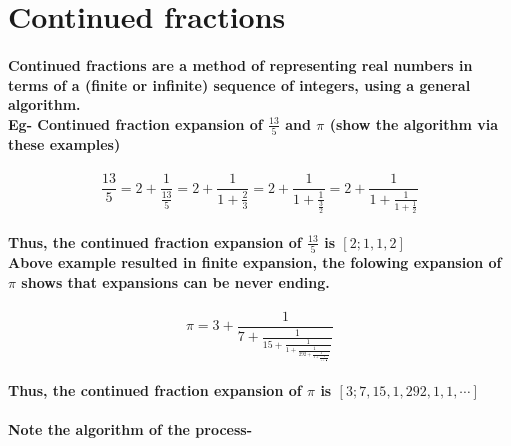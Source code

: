 \documentclass{report}
\begin{document}
\pagebreak

\section{Continued fractions}

\paragraph{Continued fractions are a method of representing real numbers in terms of a (finite or infinite) sequence of integers, using a general algorithm. \\ Eg- Continued fraction expansion of $\frac{13}{5}$ and $\pi$ (show the algorithm via these examples)}


\begin{displaymath}
{\frac{13}{5} = 2 + \frac{1}{\frac{13}{5}} = 2+ \frac{1}{1 + \frac{2}{3}} = 2+ \frac{1}{1 + \frac{1}{\frac{3}{2}}} = 2+ \frac{1}{1 + \frac{1}{1 + \frac{1}{2}}}}
\end{displaymath}

 
\paragraph{Thus, the continued fraction expansion of $\frac{13}{5}$ is $[2;1,1,2]$ \\ Above example resulted in finite expansion, the folowing expansion of $\pi$ shows that expansions can be never ending.}

\begin{displaymath}
{\pi = 3 + \frac{1}{7 + \frac{1}{15 + \frac{1}{1 + \frac{1}{292 + \frac{1}{1 + \frac{1}{1 + \frac{1}{\ddots}}}}}}}}
\end{displaymath}


\paragraph{Thus, the continued fraction expansion of $\pi$ is $[3; 7, 15, 1, 292, 1, 1,\cdots]$}

\paragraph{Note the algorithm of the process-}
\end{document}
